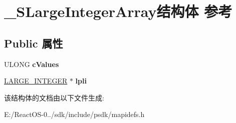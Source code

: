 \hypertarget{struct___s_large_integer_array}{}\section{\+\_\+\+S\+Large\+Integer\+Array结构体 参考}
\label{struct___s_large_integer_array}
\subsection*{Public 属性}
\begin{DoxyCompactItemize}
\item 
\mbox{\label{struct___s_large_integer_array_a469fa02847310227c68d29d512332fb9}} 
U\+L\+O\+NG {\bfseries c\+Values}
\item 
\mbox{\label{struct___s_large_integer_array_a42e131409d05d2b09948784432958aae}} 
\hyperlink{union___l_a_r_g_e___i_n_t_e_g_e_r}{L\+A\+R\+G\+E\+\_\+\+I\+N\+T\+E\+G\+ER} $\ast$ {\bfseries lpli}
\end{DoxyCompactItemize}


该结构体的文档由以下文件生成\+:\begin{DoxyCompactItemize}
\item 
E\+:/\+React\+O\+S-\/0../sdk/include/psdk/mapidefs.\+h\end{DoxyCompactItemize}
